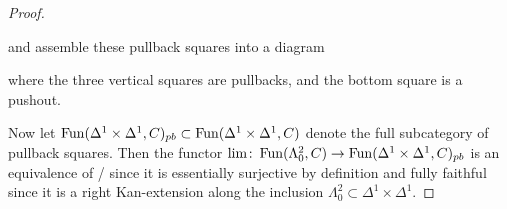 \begin{lemma}
\begin{proof}
\begin{center}
        \end{center}
        and assemble these pullback squares into a diagram
        \begin{center}
        \end{center}
        where the three vertical squares are pullbacks, and the bottom square is a pushout.

        Now let $\operatorname{Fun}(\Delta^1\times\Delta^1,C)_{pb}\subset\operatorname{Fun}(\Delta^1\times\Delta^1,C)$ denote the full subcategory of pullback squares.
        Then the functor $\lim\colon\operatorname{Fun}(\Lambda_0^2,C)\to\operatorname{Fun}(\Delta^1\times\Delta^1,C)_{pb}$ is an equivalence of \inftycats/ since it is essentially surjective by definition and fully faithful since it is a right Kan-extension along the inclusion $\Lambda_0^2\subset\Delta^1\times\Delta^1$.


\end{proof}
\end{lemma}
